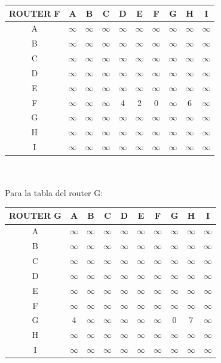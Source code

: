 \documentclass{article}
\begin{document}
\begin{tabular}{ | c | c | c | c | c | c | c | c | c | c |}
\hline                 
ROUTER F    & A      & B      & C      & D      & E      & F      & G      & H      & I      \\
\hline
        A   &$\infty$&$\infty$&$\infty$&$\infty$&$\infty$&$\infty$&$\infty$&$\infty$&$\infty$\\
\hline
        B   &$\infty$&$\infty$&$\infty$&$\infty$&$\infty$&$\infty$&$\infty$&$\infty$&$\infty$\\
\hline
        C   &$\infty$&$\infty$&$\infty$&$\infty$&$\infty$&$\infty$&$\infty$&$\infty$&$\infty$\\
\hline
        D   &$\infty$&$\infty$&$\infty$&$\infty$&$\infty$&$\infty$&$\infty$&$\infty$&$\infty$\\
\hline
        E   &$\infty$&$\infty$&$\infty$&$\infty$&$\infty$&$\infty$&$\infty$&$\infty$&$\infty$\\
\hline
        F   &$\infty$&$\infty$&$\infty$& 4      & 2      & 0      &$\infty$& 6      &$\infty$\\
\hline
        G   &$\infty$&$\infty$&$\infty$&$\infty$&$\infty$&$\infty$&$\infty$&$\infty$&$\infty$\\
\hline
        H   &$\infty$&$\infty$&$\infty$&$\infty$&$\infty$&$\infty$&$\infty$&$\infty$&$\infty$\\
\hline 
        I   &$\infty$&$\infty$&$\infty$&$\infty$&$\infty$&$\infty$&$\infty$&$\infty$&$\infty$\\
\hline
\end{tabular}
\\\\
Para la tabla del router G:\\
\begin{tabular}{ | c | c | c | c | c | c | c | c | c | c |}
\hline                 
ROUTER G    & A      & B      & C      & D      & E      & F      & G      & H      & I      \\
\hline
        A   &$\infty$&$\infty$&$\infty$&$\infty$&$\infty$&$\infty$&$\infty$&$\infty$&$\infty$\\
\hline
        B   &$\infty$&$\infty$&$\infty$&$\infty$&$\infty$&$\infty$&$\infty$&$\infty$&$\infty$\\
\hline
        C   &$\infty$&$\infty$&$\infty$&$\infty$&$\infty$&$\infty$&$\infty$&$\infty$&$\infty$\\
\hline
        D   &$\infty$&$\infty$&$\infty$&$\infty$&$\infty$&$\infty$&$\infty$&$\infty$&$\infty$\\
\hline
        E   &$\infty$&$\infty$&$\infty$&$\infty$&$\infty$&$\infty$&$\infty$&$\infty$&$\infty$\\
\hline
        F   &$\infty$&$\infty$&$\infty$&$\infty$&$\infty$&$\infty$&$\infty$&$\infty$&$\infty$\\
\hline
        G   & 4      &$\infty$&$\infty$&$\infty$&$\infty$&$\infty$& 0      & 7      &$\infty$\\
\hline
        H   &$\infty$&$\infty$&$\infty$&$\infty$&$\infty$&$\infty$&$\infty$&$\infty$&$\infty$\\
\hline 
        I   &$\infty$&$\infty$&$\infty$&$\infty$&$\infty$&$\infty$&$\infty$&$\infty$&$\infty$\\
\hline
\end{tabular}
\end{document}
